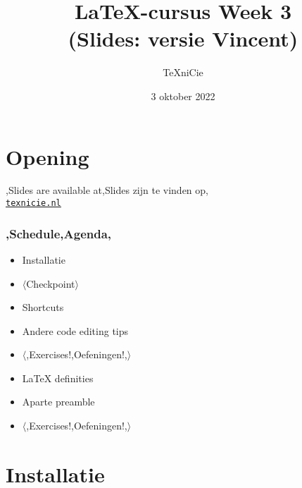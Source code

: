 \documentclass[
    dutch,
    everyoneauthor=true,
    defaultSlideCollection=vincent,
]{../../cursuspresentatie}
\title[\LaTeX{}-cursus Week 3]{\LaTeX{}-cursus Week 3\\{\small (Slides: versie Vincent)}}
\author[\TeX niCie]{\TeX niCie}
\date{3 oktober 2022}
\let\placetarget\relax
\let\placetarget\relax
\begin{document}

\section{Opening}

\begin{frame}
    \titlepage
    \centering

    {\Large\lang,Slides are available at,Slides zijn te vinden op,\\
    \href{https://texnicie.nl}{\ul{\texttt{texnicie.nl}}}}
\end{frame}

\setul{1pt}{2pt}

\begin{frame}
    \frametitle{\lang,Schedule,Agenda,}
    
    \begin{itemize}
        \item Installatie
        \item $ \langle $Checkpoint$ \rangle $
        \item Shortcuts
        \item Andere code editing tips
        \item $ \langle $\lang,Exercises!,Oefeningen!,$ \rangle $
        \item LaTeX definities
        \item Aparte preamble
        \item $ \langle $\lang,Exercises!,Oefeningen!,$ \rangle $
    \end{itemize}
\end{frame}

\section{Installatie}\label{sec:installatie}

\def\placetarget{\hypertarget{installatie}{}}


\end{document}
